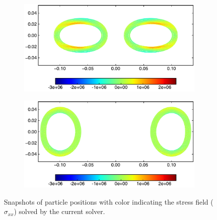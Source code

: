 \begin{figure}[!htpb]
  \begin{subfigure}{0.48\textwidth}
    \centering
    \includegraphics[width=1.0\textwidth]{figures/csph/figures/yan_2021_colliding_rubber_rings/poisson_ratio_0_47/time4}
    \label{fig:rings:ipst-nu-0.47-3}
  \end{subfigure}
%
  \begin{subfigure}{0.48\textwidth}
    \centering
    \includegraphics[width=1.0\textwidth]{figures/csph/figures/yan_2021_colliding_rubber_rings/poisson_ratio_0_47/time5}
    \label{fig:rings:ipst-nu-0.47-4}
  \end{subfigure}
  \caption{Snapshots of particle positions with color indicating the stress
    field ($\sigma_{xx}$) solved by the current solver.}
\label{fig:rings:new-ipst-nu-0-47}
\end{figure}
%

\FloatBarrier%
